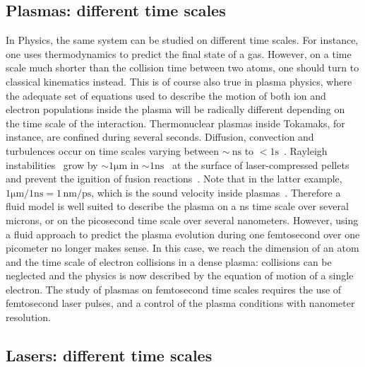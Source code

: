 \subsection{Plasmas: different time scales}

In Physics, the same system can be studied on different time scales. For instance, one uses thermodynamics to predict the final state of a gas. However, on a time scale much shorter than the collision time between two atoms, one should turn to classical kinematics instead. This is of course also true in plasma physics, where the adequate set of equations used to describe the motion of both ion and electron populations inside the plasma will be radically different depending on the time scale of the interaction. Thermonuclear plasmas inside Tokamaks, for instance, are confined during several seconds. Diffusion, convection  and turbulences occur on time scales varying between $\sim~\mathrm{ns}$ to $<1\mathrm{s}$~\cite{rax2011physique}. Rayleigh instabilities~\cite{rayleigh1878instability} grow by $\sim 1\mathrm{\mu m}$ in $\sim 1 \mathrm{ns}$~\cite{emery1982rayleigh} at the surface of laser-compressed pellets and prevent the ignition of fusion reactions~\cite{betti1998growth}. Note that in the latter example, $1\mathrm{\mu m} / 1\mathrm{ns} = 1\,\mathrm{nm/ps}$, which is the sound velocity inside plasmas~\cite{Kruer1988}. Therefore a fluid model is well suited to describe the plasma on a ns time scale over several microns, or on the picosecond time scale over several nanometers. However, using a fluid approach to predict the plasma evolution during one femtosecond over one picometer no longer makes sense. In this case, we reach the dimension of an atom and the time scale of electron collisions in a dense plasma: collisions can be neglected and the physics is now described by the equation of motion of a single electron. The study of plasmas on femtosecond time scales requires the use of femtosecond laser pulses, and a control of the plasma conditions with nanometer resolution. %


\subsection{Lasers: different time scales}

